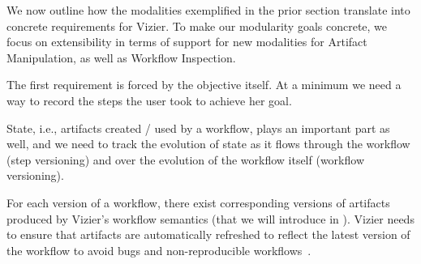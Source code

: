 We now outline how the modalities exemplified in the prior section translate into concrete requirements for Vizier.
To make our modularity goals concrete, we focus on extensibility in terms of support for new modalities for Artifact Manipulation, as well as Workflow Inspection.

The first requirement is forced by the objective itself. %
At a minimum we need a way to record the steps the user took to achieve her goal. %


State, i.e., artifacts created / used by a workflow, plays an important part as well, and we need to track the evolution of state as it flows through the workflow (step versioning) and over the evolution of the workflow itself (workflow versioning).


For each version of a workflow, there exist corresponding versions of artifacts produced by Vizier's workflow semantics (that we will introduce in ). Vizier needs to ensure that artifacts are automatically refreshed to reflect the latest version of the workflow to avoid bugs and non-reproducible workflows~\cite{PM19}. %




